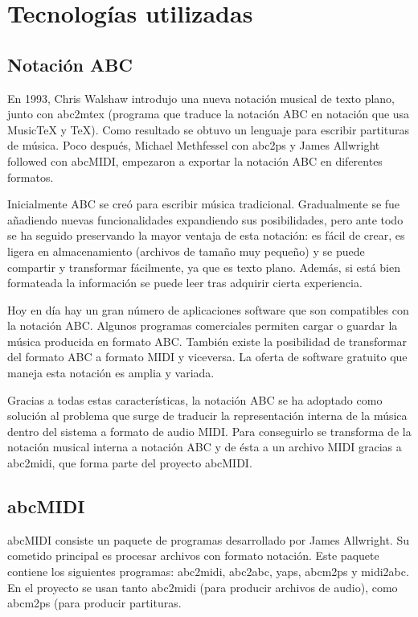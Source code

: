\chapter{Tecnologías utilizadas}

\section{Notación ABC}
\label{sec:NotacionABC}

En 1993, Chris Walshaw introdujo una nueva notación musical de texto plano, junto con abc2mtex (programa que traduce la notación ABC en notación que usa MusicTeX y TeX). Como resultado se obtuvo un lenguaje para escribir partituras de música. Poco después, Michael Methfessel con abc2ps y James Allwright followed con abcMIDI, empezaron a exportar la notación ABC en diferentes formatos.

Inicialmente ABC se creó para escribir música tradicional. Gradualmente se fue añadiendo nuevas funcionalidades expandiendo sus posibilidades, pero ante todo se ha seguido preservando la mayor ventaja de esta notación: es fácil de crear, es ligera en almacenamiento (archivos de tamaño muy pequeño) y se puede compartir y transformar fácilmente, ya que es texto plano. Además, si está bien formateada la información se puede leer tras adquirir cierta experiencia.

Hoy en día hay un gran número de aplicaciones software que son compatibles con la notación ABC. Algunos programas comerciales permiten cargar o guardar la música producida en formato ABC. También existe la posibilidad de transformar del formato ABC a formato MIDI y viceversa. La oferta de software gratuito que maneja esta notación es amplia y variada. 

Gracias a todas estas características, la notación ABC se ha adoptado como solución al problema que surge de traducir la representación interna de la música dentro del sistema a formato de audio MIDI. Para conseguirlo se transforma de la notación musical interna a notación ABC y de ésta a un archivo MIDI gracias a abc2midi, que forma parte del proyecto abcMIDI.

\section{abcMIDI}
\label{sec:abcMIDI}

abcMIDI consiste un paquete de programas desarrollado por James Allwright. Su cometido principal es procesar archivos con formato notación. Este paquete contiene los siguientes programas: abc2midi, abc2abc, yaps, abcm2ps y midi2abc. En el proyecto se usan tanto abc2midi (para producir archivos de audio), como abcm2ps (para producir partituras.

